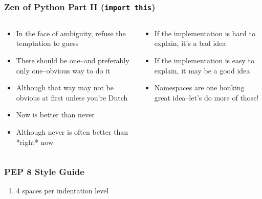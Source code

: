\documentclass{beamer}
\begin{document}
  \begin{frame}
    \frametitle{Zen of Python Part II (\texttt{import this})}
    \begin{columns}
      \begin{column}{0.5\textwidth}
        \begin{itemize}
          \item In the face of ambiguity, refuse the temptation to guess
          \item There should be one--and preferably only one--obvious way to do it
	  \item Although that way may not be obvious at first unless you're Dutch
	  \item Now is better than never
          \item Although never is often better than *right* now
        \end{itemize}
      \end{column}
      \begin{column}{0.5\textwidth}
        \begin{itemize}
       	  \item If the implementation is hard to explain, it's a bad idea
	  \item If the implementation is easy to explain, it may be a good idea
	  \item Namespaces are one honking great idea--let's do more of those!
        \end{itemize}
      \end{column}
    \end{columns}
  \end{frame}

  \begin{frame}
    \frametitle{PEP 8 Style Guide}
    \begin{enumerate}
      \item 4 spaces per indentation level
    \end{enumerate}
  \end{frame}
\end{document}
